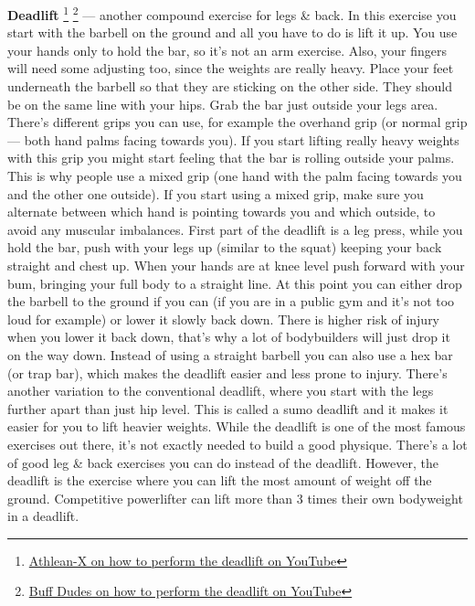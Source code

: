 \documentclass[openany, 12pt]{book}
\begin{document}
        \textbf{Deadlift}
        \footnote{\href{https://www.youtube.com/watch?v=hCDzSR6bW10}{Athlean-X on how to perform the deadlift on YouTube}}
        \footnote{\href{https://www.youtube.com/watch?v=-4qRntuXBSc}{Buff Dudes on how to perform the deadlift on YouTube}}
        --- another compound exercise for legs \& back. In this exercise you start with the barbell on the ground and all you have to do is lift it up.
        You use your hands only to hold the bar, so it's not an arm exercise. Also, your fingers will need some adjusting too, since the weights are really heavy.
        Place your feet underneath the barbell so that they are sticking on the other side. They should be on the same line with your hips. Grab the bar just outside your legs area. 
        There's different grips you can use, for example the overhand grip (or normal grip --- both hand palms facing towards you).
        If you start lifting really heavy weights with this grip you might start feeling that the
        bar is rolling outside your palms. This is why people use a mixed grip (one hand with the palm facing towards you and the other one outside). If you start using a mixed grip,
        make sure you alternate between which hand is pointing towards you and which outside, to avoid any muscular imbalances.
        First part of the deadlift is a leg press, while you hold the bar, push with your legs up (similar to the squat) keeping your back straight and chest up. When your hands are at knee level
        push forward with your bum, bringing your full body to a straight line. At this point you can either drop the barbell to the ground if you can (if you are in a public gym and it's not too loud
        for example) or lower it slowly back down. There is higher risk of injury when you lower it back down, that's why a lot of bodybuilders will just drop it on the way down.
        Instead of using a straight barbell you can also use a hex bar (or trap bar), which makes the deadlift easier and less prone to injury. There's another variation to the conventional deadlift,
        where you start with the legs further apart than just hip level. This is called a sumo deadlift and it makes it easier for you to lift heavier weights.
        While the deadlift is one of the most famous exercises out there, it's not exactly needed to build a good physique. There's a lot of good leg \& back exercises you can do instead
        of the deadlift. However, the deadlift is the exercise where you can lift the most amount of weight off the ground. Competitive powerlifter can lift more than 3 times their own bodyweight in a
        deadlift.
\end{document}
